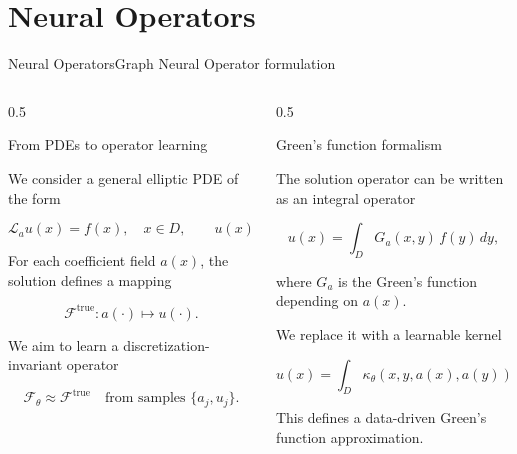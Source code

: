 \documentclass[aspectratio=169,t,11pt,table]{beamer}
{\setbeamercovered{transparent}}
\begin{document}
\section{Neural Operators}


\begin{frame}{Neural Operators}{Graph Neural Operator formulation}

\vspace{-0.7cm}
\begin{columns}[T]

\begin{column}{0.5\textwidth}
\begin{purpleBlock}{\centering\small{From PDEs to operator learning}}

\tiny

We consider a general elliptic PDE of the form

\[
\mathcal{L}_a u(x) = f(x), \quad x \in D,
\qquad
u(x) = 0, \quad x \in \partial D.
\]

For each coefficient field $a(x)$, the solution defines a mapping

\[
\mathcal{F}^{\text{true}}: a(\cdot) \mapsto u(\cdot).
\]

We aim to learn a discretization-invariant operator

\[
\mathcal{F}_\theta \approx \mathcal{F}^{\text{true}}
\quad \text{from samples } \{a_j, u_j\}.
\]

\end{purpleBlock}
\end{column}
\begin{column}{0.5\textwidth}
\begin{purpleBlock}{\centering\small{Green's function formalism}}

\tiny

The solution operator can be written as an integral operator

\[
u(x) = \int_D G_a(x,y)\, f(y)\, dy,
\]

where $G_a$ is the Green’s function depending on $a(x)$.

We replace it with a learnable kernel

\[
u(x)
=
\int_D \kappa_\theta(x,y,a(x),a(y))\, u(y)\, dy.
\]

This defines a data-driven Green’s function approximation.

\end{purpleBlock}
\end{column}
\end{columns}

\end{frame}
\end{document}
